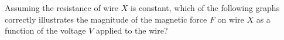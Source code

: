 \begin{questions}\setcounter{question}{5}\question
Assuming the resistance of wire $X$ is constant, which of the following graphs correctly illustrates the magnitude of the magnetic force $F$ on wire $X$ as a function of the voltage $V$ applied to the wire?

\begin{oneparchoices}
\choice {}
\choice {}
\choice {}

\end{oneparchoices}
\end{questions}
